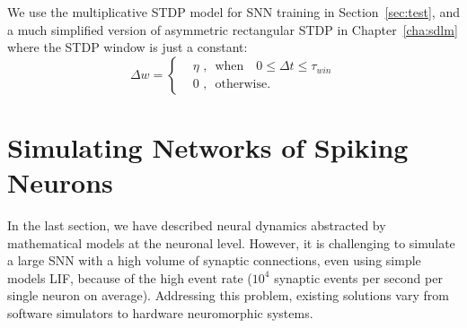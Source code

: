 We use the multiplicative STDP model for SNN training in Section~\ref{sec:test}, and a much simplified version of asymmetric rectangular STDP in Chapter~\ref{cha:sdlm} where the STDP window is just a constant:
\begin{equation}
\Delta w = \left\{
\begin{aligned}
&\eta \textrm{~,~~when~~~} 0 \leq \Delta  t \leq \tau_{win}\\
& 0 \textrm{~,~~otherwise}.
\end{aligned}
\right.
\end{equation}

\section{Simulating Networks of Spiking Neurons}
\label{sec:snn_sim}
In the last section, we have described neural dynamics \DIFdelbegin {}\DIFdelend \DIFaddbegin {}\DIFaddend abstracted by mathematical models at the neuronal level.
However, it is challenging to simulate a large SNN with a high volume of synaptic connections, even using simple models \DIFdelbegin {}\DIFdelend \DIFaddbegin {}\DIFaddend LIF, because of the high event rate ($10^4$ synaptic events per second per single neuron on average).
Addressing this problem, existing solutions vary from software simulators to hardware neuromorphic systems.

